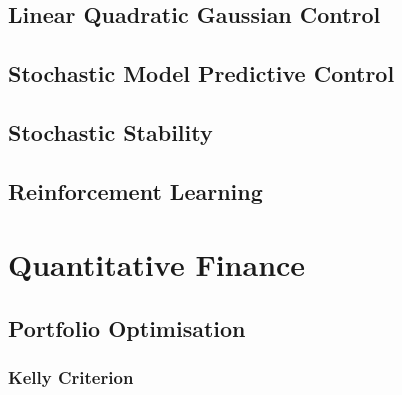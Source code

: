 \documentclass[11pt]{report} %
\begin{document}
\section{Linear Quadratic Gaussian Control}

\section{Stochastic Model Predictive Control}

\section{Stochastic Stability}

\section{Reinforcement Learning}

\chapter{Quantitative Finance}

\section{Portfolio Optimisation}

\subsection{Kelly Criterion}
\end{document}
